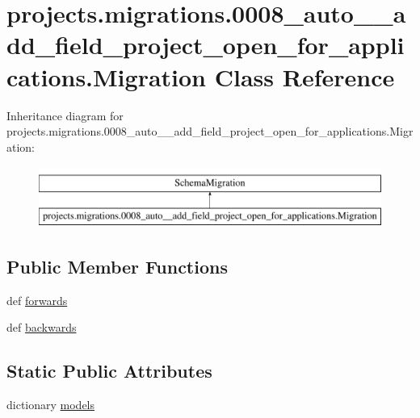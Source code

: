 \hypertarget{classprojects_1_1migrations_1_10008__auto____add__field__project__open__for__applications_1_1_migration}{\section{projects.\-migrations.0008\-\_\-auto\-\_\-\-\_\-add\-\_\-field\-\_\-project\-\_\-open\-\_\-for\-\_\-applications.Migration Class Reference}
\label{classprojects_1_1migrations_1_10008__auto____add__field__project__open__for__applications_1_1_migration}
}
Inheritance diagram for projects.\-migrations.0008\-\_\-auto\-\_\-\-\_\-add\-\_\-field\-\_\-project\-\_\-open\-\_\-for\-\_\-applications.Migration\-:\begin{figure}[H]
\begin{center}
\leavevmode
\includegraphics[height=2.000000cm]{classprojects_1_1migrations_1_10008__auto____add__field__project__open__for__applications_1_1_migration}
\end{center}
\end{figure}
\subsection*{Public Member Functions}
\begin{DoxyCompactItemize}
\item 
def \hyperlink{classprojects_1_1migrations_1_10008__auto____add__field__project__open__for__applications_1_1_migration_ac2fd53e7ab8f5962ff7e7a4bf4604974}{forwards}
\item 
def \hyperlink{classprojects_1_1migrations_1_10008__auto____add__field__project__open__for__applications_1_1_migration_a3049a01f02c2b6e751d50edd13704c62}{backwards}
\end{DoxyCompactItemize}
\subsection*{Static Public Attributes}
\begin{DoxyCompactItemize}
\item 
dictionary \hyperlink{classprojects_1_1migrations_1_10008__auto____add__field__project__open__for__applications_1_1_migration_a5dc94fc09944583c3e5710dcaf6eee92}{models}
\end{DoxyCompactItemize}


